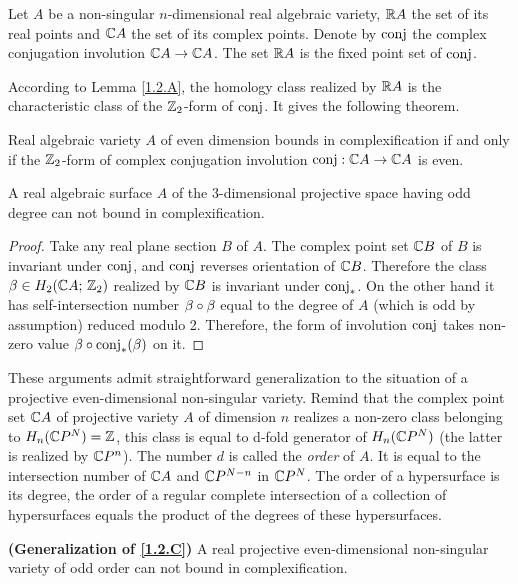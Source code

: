 \documentclass{article}
\numberwithin{equation}{section}
\begin{document}
Let $A$ be a non-singular
$n$-dimensional real algebraic variety, $\mathbb R A$ the set of its real
points and $\mathbb C A$ the set of its complex points. Denote by $\operatorname{conj}$ the
complex conjugation involution $\mathbb C A\to\mathbb C A$. The set $\mathbb R A$ is the fixed
point set of $\operatorname{conj}$.

According to Lemma \ref{1.2.A}, the homology class realized by $\mathbb R A$ is
the characteristic class of the $\mathbb Z_2$-form of $\operatorname{conj}$. It gives the
following theorem.

\begin{thm}\label{1.2.B} 
Real algebraic variety $A$ of even dimension
bounds in complexification if and only if the $\mathbb Z_2$-form of complex
conjugation involution $\operatorname{conj}:\mathbb C A\to\mathbb C A$ is even. 
\end{thm}


\begin{cor}\label{1.2.C}
 A real algebraic surface $A$ of the
3-dimensional projective space having odd degree can not bound in
complexification.
\end{cor}

\begin{proof} Take any real plane section $B$ of $A$. The complex point set
$\mathbb C B$ of $B$ is invariant under $\operatorname{conj}$, and $\operatorname{conj}$ reverses orientation
of $\mathbb C B$. Therefore the class $\beta\in H_2(\mathbb C A;\,\mathbb Z_2)$ realized by $\mathbb C B$
is invariant under $\operatorname{conj}_*$.
On the other hand it has self-intersection number $\beta\circ\beta$ equal to
the degree of $A$ (which is odd by assumption) reduced
modulo 2.  Therefore, the form of involution $\operatorname{conj}$ takes non-zero
value $\beta\circ\operatorname{conj}_*(\beta)$ on it. 
\end{proof}

These arguments admit straightforward generalization to the situation
of a projective even-dimensional non-singular variety. Remind that the complex
point set $\mathbb C A$ of projective variety $A$ of dimension $n$ realizes a non-zero
class belonging to $H_n(\mathbb C P^N)=\mathbb Z$, this class is equal to d-fold
generator of $H_n(\mathbb C P^N)$ (the latter is realized by $\mathbb C P^n$). The
number $d$ is called the {\it order  \/} of $A$. It is equal to the
intersection number of $\mathbb C A$ and $\mathbb C P^{N-n}$ in $\mathbb C P^N$. The order of
a hypersurface is its degree, the order of a regular complete
intersection of a collection of hypersurfaces equals the product of the
degrees of these hypersurfaces.

\begin{thm}\label{1.2.D} \textbf{ (Generalization of \ref{1.2.C})}
 A real projective even-dimensional
non-singular variety of odd order can not bound in complexification.
\end{thm}
\end{document}
